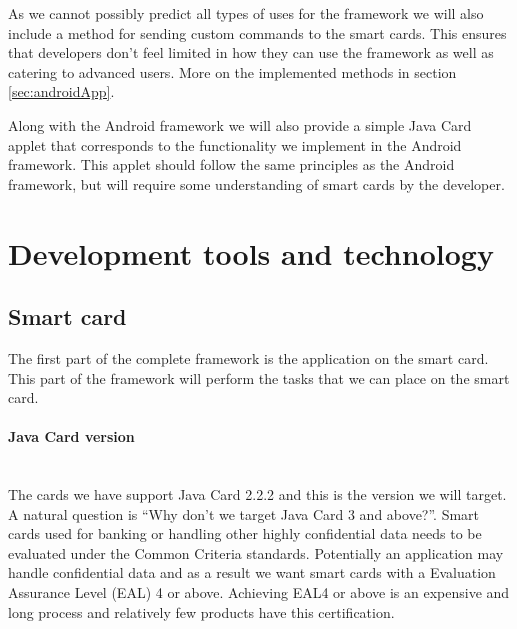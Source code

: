 As we cannot possibly predict all types of uses for the framework we will also include a method for sending custom commands to the smart cards. This ensures that developers don't feel limited in how they can use the framework as well as catering to advanced users. More on the implemented methods in section \ref{sec:androidApp}.

Along with the Android framework we will also provide a simple Java Card applet that corresponds to the functionality we implement in the Android framework. This applet should follow the same principles as the Android framework, but will require some understanding of smart cards by the developer.

\section{Development tools and technology}
\label{sec:devAndTech}

\subsection{Smart card}
The first part of the complete framework is the application on the smart card. This part of the framework will perform the tasks that we can place on the smart card.

\paragraph{Java Card version}\mbox{}\\
The cards we have support Java Card 2.2.2 and this is the version we will target. A natural question is ``Why don't we target Java Card 3 and above?''. Smart cards used for banking or handling other highly confidential data needs to be evaluated under the Common Criteria \cite[Ch.~26.3.2]{securityEngineering} standards. Potentially an application may handle confidential data and as a result we want smart cards with a Evaluation Assurance Level (EAL) 4 or above. Achieving EAL4 or above is an expensive and long process and relatively few products have this certification.


